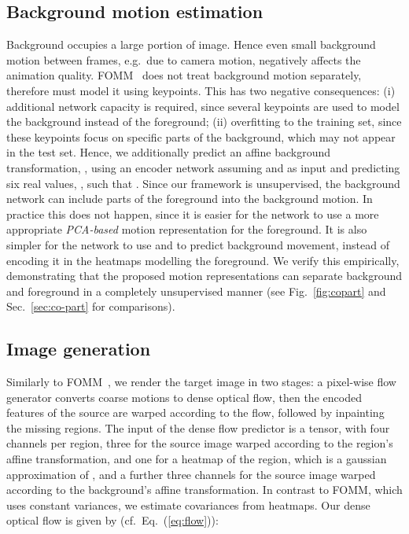 \documentclass[final]{cvpr}
\begin{document}
\subsection{Background motion estimation} 
\label{sec:bg}
\vspace{-0.1cm}
Background occupies a large portion of image. Hence even small background motion between frames, e.g.\ due to camera motion, negatively affects the animation quality. 
FOMM~\cite{fomm} does not treat background motion separately, therefore must model it using keypoints. This has two negative consequences: (i) additional network capacity is required, since several keypoints are used to model the background instead of the foreground; (ii) overfitting to the training set, since these keypoints focus on specific parts of the background, which may not appear in the test set. Hence, we additionally predict an affine background transformation, , using an encoder network assuming  and  as input and predicting six real values, , such that
.
Since our framework is unsupervised, the background network can include parts of the foreground into the background motion. In practice this does not happen, since it is easier for the network to use a more appropriate \emph{PCA-based} motion representation for the foreground. It is also simpler for the network to use  and  to predict background movement, instead of encoding it in the heatmaps modelling the foreground. We verify this empirically, demonstrating that the proposed motion representations can separate background and foreground in a completely unsupervised manner (see Fig.~\ref{fig:copart} and Sec.~\ref{sec:co-part} for comparisons).
\vspace{-0.1cm}
\subsection{Image generation}
\vspace{-0.1cm}
Similarly to FOMM~\cite{fomm}, we render the target image in two stages: a pixel-wise flow generator converts coarse motions to dense optical flow, then the encoded features of the source are warped according to the flow, followed by inpainting the missing regions. The input of the dense flow predictor is a  tensor, with four channels per region, three for the source image warped according to the region's affine transformation, and one for a heatmap of the region, which is a gaussian approximation of , and a further three channels for the source image warped according to the background's affine transformation. In contrast to FOMM, which uses constant variances, we estimate covariances from heatmaps. Our dense optical flow is given by (cf.\ Eq.~(\ref{eq:flow})):
\end{document}
